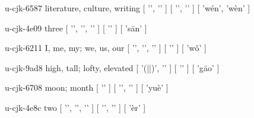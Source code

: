 \begin{multicols}{2}
\cjkgGlue{} u-cjk-6587  literature, culture, writing  [ '\cjkgGlue{}', '\cjkgGlue{}' ]  [ '\cjkgGlue{}', '\cjkgGlue{}' ]  [ 'wén', 'wèn' ] 

\cjkgGlue{} u-cjk-4e09  three  [ '\cjkgGlue{}', '\cjkgGlue{}', '\cjkgGlue{}' ]  [ '\cjkgGlue{}' ]  [ 's{\mktsRsgFb{}ā}n' ] 

\cjkgGlue{} u-cjk-6211  I, me, my; we, us, our  [ '\cjkgGlue{}', '\cjkgGlue{}', '\cjkgGlue{}' ]  [ '\cjkgGlue{}' ]  [ 'w{\mktsRsgFb{}ǒ}' ] 

\cjkgGlue{} u-cjk-9ad8  high, tall; lofty, elevated  [ '\cjkgGlue{}(\cjkgGlue{}|\cjkgGlue{}|\cjkgGlue{})', '\cjkgGlue{}' ]  [ '\cjkgGlue{}' ]  [ 'g{\mktsRsgFb{}ā}o' ] 

\cjkgGlue{} u-cjk-6708  moon; month  [ '\cjkgGlue{}' ]  [ '\cjkgGlue{}', '\cjkgGlue{}' ]  [ 'yuè' ] 

\cjkgGlue{} u-cjk-4e8c  two  [ '\cjkgGlue{}', '\cjkgGlue{}', '\cjkgGlue{}' ]  [ '\cjkgGlue{}', '\cjkgGlue{}' ]  [ 'èr' ] 


\end{multicols}

